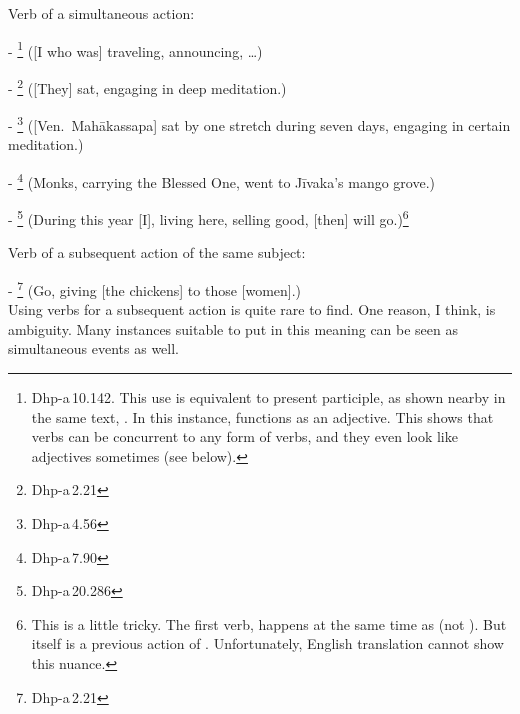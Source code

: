 \begin{compactenum}[(1)]
\item Verb of a simultaneous action:\par
- \footnote{Dhp-a\,10.142. This use is equivalent to present participle, as shown nearby in the same text, . In this instance,  functions as an adjective. This shows that  verbs can be concurrent to any form of verbs, and they even look like adjectives sometimes (see below).} ([I who was] traveling, announcing, \ldots)\par
- \footnote{Dhp-a\,2.21} ([They] sat, engaging in deep meditation.)\par
- \footnote{Dhp-a\,4.56} ([Ven.\ Mah\=akassapa] sat by one stretch during seven days, engaging in certain meditation.)\par
- \footnote{Dhp-a\,7.90} (Monks, carrying the Blessed One, went to J\=ivaka's mango grove.)\par
- \footnote{Dhp-a\,20.286} (During this year [I], living here, selling good, [then] will go.)\footnote{This is a little tricky. The first  verb,  happens at the same time as  (not ). But  itself is a previous action of . Unfortunately, English translation cannot show this nuance.}\par

\item Verb of a subsequent action of the same subject:\par
- \footnote{Dhp-a\,2.21} (Go, giving [the chickens] to those [women].)\\[1.5mm]
Using  verbs for a subsequent action is quite rare to find. One reason, I think, is ambiguity. Many instances suitable to put in this meaning can be seen as simultaneous events as well.


\end{compactenum}
